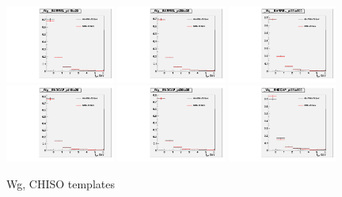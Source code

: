 \begin{figure}[htb]
  \begin{center}
  \includegraphics[width=0.32\textwidth]{../figs/figs_v11/ChannelsMERGED_WGamma/QuickChecks/cTemplatesVsWMt_Wg_phoPFChIsoCorr_BARREL_pt15to20.pdf} \includegraphics[width=0.32\textwidth]{../figs/figs_v11/ChannelsMERGED_WGamma/QuickChecks/cTemplatesVsWMt_Wg_phoPFChIsoCorr_BARREL_pt20to35.pdf} \includegraphics[width=0.32\textwidth]{../figs/figs_v11/ChannelsMERGED_WGamma/QuickChecks/cTemplatesVsWMt_Wg_phoPFChIsoCorr_BARREL_pt35to500.pdf}\\
  \includegraphics[width=0.32\textwidth]{../figs/figs_v11/ChannelsMERGED_WGamma/QuickChecks/cTemplatesVsWMt_Wg_phoPFChIsoCorr_ENDCAP_pt15to20.pdf} \includegraphics[width=0.32\textwidth]{../figs/figs_v11/ChannelsMERGED_WGamma/QuickChecks/cTemplatesVsWMt_Wg_phoPFChIsoCorr_ENDCAP_pt20to35.pdf} \includegraphics[width=0.32\textwidth]{../figs/figs_v11/ChannelsMERGED_WGamma/QuickChecks/cTemplatesVsWMt_Wg_phoPFChIsoCorr_ENDCAP_pt35to500.pdf}\\
  \caption{Wg, CHISO templates}
  \label{fig:templatesVsWMt_Wg_CHISO}
  \end{center}
\end{figure}

